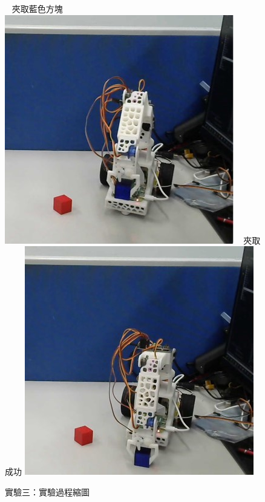 \documentclass[class=NCU_thesis, crop=false]{standalone}
\begin{document}
\begin{figure}[h]
    ~    
    \subcaptionbox
        {夾取藍色方塊
        \label{fig:fig-dataset-contrast-after-adjustment}}
        {\includegraphics[width=0.4\linewidth]{figures/Exp3 (6)_square.jpg}}
    ~
    \subcaptionbox
        {夾取成功
        \label{fig:fig-dataset-contrast-after-adjustment}}
        {\includegraphics[width=0.4\linewidth]{figures/Exp3 (7)_square.jpg}}   
\caption{實驗三：實驗過程縮圖}
\end{figure}
\end{document}
